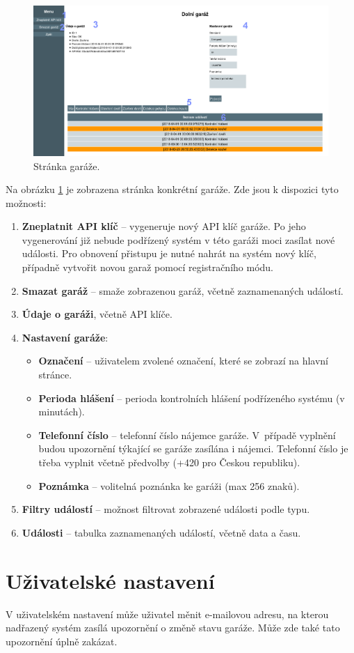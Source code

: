 \begin{figure}[h!]
    \centering
    \includegraphics[width=\textwidth]{images/garage_page.png}
    \caption[Stránka garáže]{Stránka garáže.}
    \label{fig:garage_page}
\end{figure}

Na obrázku \ref{fig:garage_page} je zobrazena stránka konkrétní garáže. Zde jsou k dispozici tyto možnosti:

\begin{enumerate}
    \item \textbf{Zneplatnit API klíč} -- vygeneruje nový API klíč garáže. Po jeho vygenerování již nebude podřízený systém v této garáži moci zasílat nové události. Pro obnovení přistupu je nutné nahrát na systém nový klíč, případně vytvořit novou garaž pomocí registračního módu.
    \item \textbf{Smazat garáž} -- smaže zobrazenou garáž, včetně zaznamenaných událostí.
    \item \textbf{Údaje o garáži}, včetně API klíče.
    \item \textbf{Nastavení garáže}:
    \begin{itemize}
        \item \textbf{Označení} -- uživatelem zvolené označení, které se zobrazí na hlavní stránce.
        \item \textbf{Perioda hlášení} -- perioda kontrolních hlášení podřízeného systému (v minutách).
        \item \textbf{Telefonní číslo} -- telefonní číslo nájemce garáže. V~případě vyplnění budou upozornění týkající se garáže zasílána i nájemci. Telefonní číslo je třeba vyplnit včetně předvolby (+420 pro Českou republiku).
        \item \textbf{Poznámka} -- volitelná poznánka ke garáži (max 256 znaků).
    \end{itemize}
    \item \textbf{Filtry událostí} -- možnost filtrovat zobrazené události podle typu.
    \item \textbf{Události} -- tabulka zaznamenaných událostí, včetně data a času.
\end{enumerate}


\section{Uživatelské nastavení}
\label{sec:guide_user_settings}

V uživatelském nastavení může uživatel měnit e-mailovou adresu, na kterou nadřazený systém zasílá upozornění o změně stavu garáže. Může zde také tato upozornění úplně zakázat.